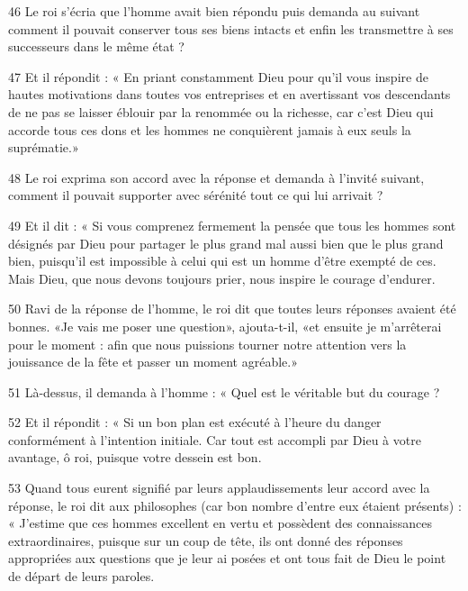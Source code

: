 \par 46 Le roi s'écria que l'homme avait bien répondu puis demanda au suivant comment il pouvait conserver tous ses biens intacts et enfin les transmettre à ses successeurs dans le même état ?

\par 47 Et il répondit : « En priant constamment Dieu pour qu'il vous inspire de hautes motivations dans toutes vos entreprises et en avertissant vos descendants de ne pas se laisser éblouir par la renommée ou la richesse, car c'est Dieu qui accorde tous ces dons et les hommes ne conquièrent jamais à eux seuls la suprématie.»

\par 48 Le roi exprima son accord avec la réponse et demanda à l'invité suivant, comment il pouvait supporter avec sérénité tout ce qui lui arrivait ?

\par 49 Et il dit : « Si vous comprenez fermement la pensée que tous les hommes sont désignés par Dieu pour partager le plus grand mal aussi bien que le plus grand bien, puisqu'il est impossible à celui qui est un homme d'être exempté de ces. Mais Dieu, que nous devons toujours prier, nous inspire le courage d'endurer.

\par 50 Ravi de la réponse de l'homme, le roi dit que toutes leurs réponses avaient été bonnes. «Je vais me poser une question», ajouta-t-il, «et ensuite je m'arrêterai pour le moment : afin que nous puissions tourner notre attention vers la jouissance de la fête et passer un moment agréable.»

\par 51 Là-dessus, il demanda à l'homme : « Quel est le véritable but du courage ?

\par 52 Et il répondit : « Si un bon plan est exécuté à l'heure du danger conformément à l'intention initiale. Car tout est accompli par Dieu à votre avantage, ô roi, puisque votre dessein est bon.

\par 53 Quand tous eurent signifié par leurs applaudissements leur accord avec la réponse, le roi dit aux philosophes (car bon nombre d'entre eux étaient présents) : « J'estime que ces hommes excellent en vertu et possèdent des connaissances extraordinaires, puisque sur un coup de tête, ils ont donné des réponses appropriées aux questions que je leur ai posées et ont tous fait de Dieu le point de départ de leurs paroles.

